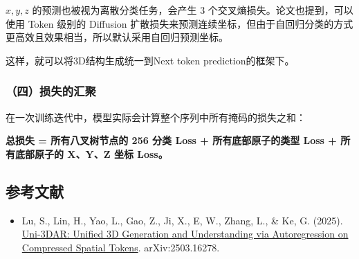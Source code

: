 \(x,y,z\) 的预测也被视为离散分类任务，会产生 3 个交叉熵损失。论文也提到，可以使用 Token 级别的 Diffusion 扩散损失来预测连续坐标，但由于自回归分类的方式更高效且效果相当，所以默认采用自回归预测坐标。

这样，就可以将3D结构生成统一到Next token prediction的框架下。

\hypertarget{ux56dbux635fux5931ux7684ux6c47ux805a}{%
\subsubsection{（四）损失的汇聚}\label{ux56dbux635fux5931ux7684ux6c47ux805a}}

在一次训练迭代中，模型实际会计算整个序列中所有掩码的损失之和：

\textbf{总损失 = 所有八叉树节点的 256 分类 Loss + 所有底部原子的类型 Loss + 所有底部原子的 X、Y、Z 坐标 Loss。}

\hypertarget{ux53c2ux8003ux6587ux732e-199}{%
\subsection{参考文献}\label{ux53c2ux8003ux6587ux732e-199}}

\begin{itemize}
\tightlist
\item
  Lu, S., Lin, H., Yao, L., Gao, Z., Ji, X., E, W., Zhang, L., \& Ke, G. (2025). \href{https://arxiv.org/abs/2503.16278}{Uni-3DAR: Unified 3D Generation and Understanding via Autoregression on Compressed Spatial Tokens}. arXiv:2503.16278.
\end{itemize}

\clearpage
